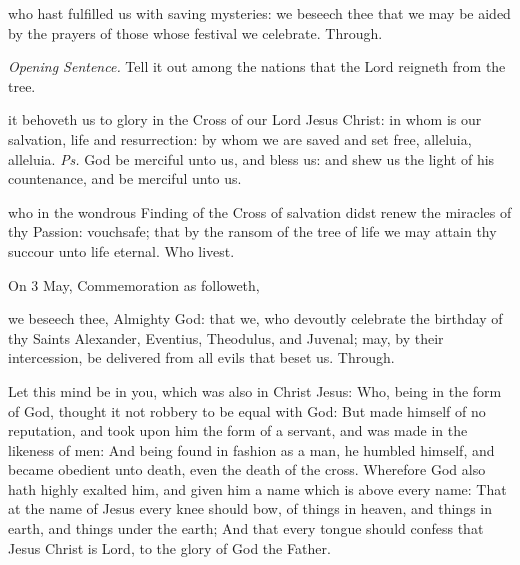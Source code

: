 \postcommunion
{} who hast fulfilled us with saving mysteries: we beseech thee that we may be aided by the prayers of those whose festival we celebrate. Through.


\par\noindent
\textit{Opening Sentence.} Tell it out among the nations that the Lord reigneth from the tree.\par

\introit
{} it behoveth us to glory in the Cross of our Lord Jesus Christ: in whom is our salvation, life and resurrection: by whom we are saved and set free, alleluia, alleluia. \textit{Ps.} God be merciful unto us, and bless us: and shew us the light of his countenance, and be merciful unto us.

\collect
{} who in the wondrous Finding of the Cross of salvation didst renew the miracles of thy Passion: vouchsafe; that by the ransom of the tree of life we may attain thy succour unto life eternal. Who livest.
\begin{rubric}
	 On 3 May, Commemoration  as followeth,
\end{rubric}
 we beseech thee, Almighty God: that we, who devoutly celebrate the birthday of thy Saints Alexander, Eventius, Theodulus, and Juvenal; may, by their intercession, be delivered from all evils that beset us. Through.

 Let this mind be in you, which was also in Christ Jesus: Who, being in the form of God, thought it not robbery to be equal with God: But made himself of no reputation, and took upon him the form of a servant, and was made in the likeness of men: And being found in fashion as a man, he humbled himself, and became obedient unto death, even the death of the cross. Wherefore God also hath highly exalted him, and given him a name which is above every name: That at the name of Jesus every knee should bow, of things in heaven, and things in earth, and things under the earth; And that every tongue should confess that Jesus Christ is Lord, to the glory of God the Father.

